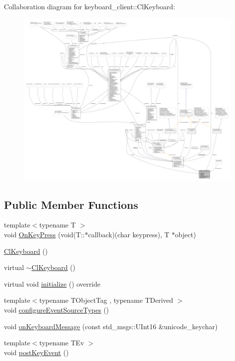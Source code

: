 Collaboration diagram for keyboard\+\_\+client\+:\+:Cl\+Keyboard\+:
\nopagebreak
\begin{figure}[H]
\begin{center}
\leavevmode
\includegraphics[width=350pt]{classkeyboard__client_1_1ClKeyboard__coll__graph}
\end{center}
\end{figure}
\subsection*{Public Member Functions}
\begin{DoxyCompactItemize}
\item 
{\footnotesize template$<$typename T $>$ }\\void \hyperlink{classkeyboard__client_1_1ClKeyboard_a09581faae1ada2cdd53010ebb9a2197a}{On\+Key\+Press} (void(T\+::$\ast$callback)(char keypress), T $\ast$object)
\item 
\hyperlink{classkeyboard__client_1_1ClKeyboard_a4da263c77c076b959c4c21160af1bcb5}{Cl\+Keyboard} ()
\item 
virtual \hyperlink{classkeyboard__client_1_1ClKeyboard_a0e9bfb4a0e564e26f57248a78a78d087}{$\sim$\+Cl\+Keyboard} ()
\item 
virtual void \hyperlink{classkeyboard__client_1_1ClKeyboard_a7ac4502969c62b0c836b531cec05f8ed}{initialize} () override
\item 
{\footnotesize template$<$typename T\+Object\+Tag , typename T\+Derived $>$ }\\void \hyperlink{classkeyboard__client_1_1ClKeyboard_a9643ea9235ee12d054c87f79fbf31211}{configure\+Event\+Source\+Types} ()
\item 
void \hyperlink{classkeyboard__client_1_1ClKeyboard_adbfb9c2b98f784b12cf7740b4e861d8e}{on\+Keyboard\+Message} (const std\+\_\+msgs\+::\+U\+Int16 \&unicode\+\_\+keychar)
\item 
{\footnotesize template$<$typename T\+Ev $>$ }\\void \hyperlink{classkeyboard__client_1_1ClKeyboard_ad62d3548adfeca7f31469a283454dbeb}{post\+Key\+Event} ()
\end{DoxyCompactItemize}
